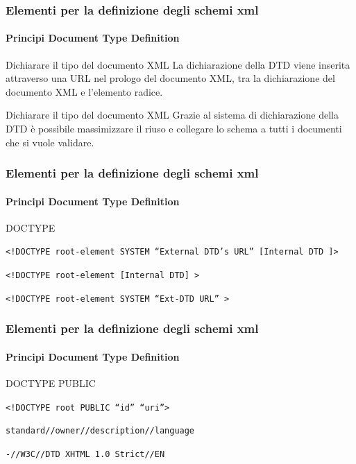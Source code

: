 \begin{frame}
    \frametitle{Elementi per la definizione degli schemi xml}
    \framesubtitle{Principi Document Type Definition}
    \addtocounter{nframe}{1}

    \begin{block}{Dichiarare il tipo del documento XML}
        La dichiarazione della DTD viene inserita attraverso una URL nel prologo del documento XML, tra la dichiarazione del documento XML e l'elemento radice.
    \end{block}

    \begin{block}{Dichiarare il tipo del documento XML}
        Grazie al sistema di dichiarazione della DTD è possibile massimizzare il riuso e collegare lo schema a tutti i documenti che si vuole validare.
    \end{block}

\end{frame}

\begin{frame}
    \frametitle{Elementi per la definizione degli schemi xml}
    \framesubtitle{Principi Document Type Definition}
    \addtocounter{nframe}{1}

    \begin{block}{DOCTYPE}
    \begin{center}\texttt{<!DOCTYPE root-element SYSTEM ``External DTD’s URL'' [Internal DTD ]>}\end{center}
    \begin{center}\texttt{<!DOCTYPE root-element [Internal DTD] >}\end{center}
    \begin{center}\texttt{<!DOCTYPE root-element SYSTEM ``Ext-DTD URL'' >}\end{center}
        
    \end{block}

\end{frame}


\begin{frame}
    \frametitle{Elementi per la definizione degli schemi xml}
    \framesubtitle{Principi Document Type Definition}
    \addtocounter{nframe}{1}

    \begin{block}{DOCTYPE PUBLIC}
    \begin{center}\texttt{<!DOCTYPE root PUBLIC “id” “uri”>}\end{center}
    \begin{center}\texttt{standard//owner//description//language}\end{center}
    \begin{center}\texttt{-//W3C//DTD XHTML 1.0 Strict//EN}\end{center}
        
    \end{block}

\end{frame}

